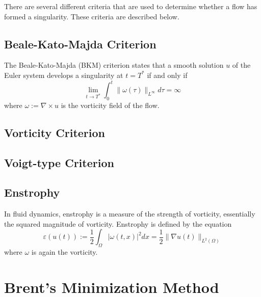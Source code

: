 \documentclass[12pt]{article}
\begin{document}
\begin{flushleft}
\qquad There are several different criteria that are used to determine whether a flow has formed a singularity. These criteria are described below.

\subsection{Beale-Kato-Majda Criterion}
The Beale-Kato-Majda (BKM) criterion states that a smooth solution $u$ of the Euler system develops a singularity at $t=T^*$ if and only if
$$\lim_{t\rightarrow T^*}\int_0^t \|\omega(\tau)\|_{L^\infty}d\tau = \infty$$
where $\omega:=\nabla\times u$ is the vorticity field of the flow. 

\subsection{Vorticity Criterion}
\subsection{Voigt-type Criterion}
\subsection{Enstrophy}
In fluid dynamics, enstrophy is a measure of the strength of vorticity, essentially the squared magnitude of vorticity. Enstrophy is defined by the equation
$$\varepsilon(u(t)):=\frac{1}{2}\int_{\Omega}|\omega(t,x)|^2dx = \frac{1}{2}\|\nabla u(t)\|_{L^2(\Omega)}$$
where $\omega$ is again the vorticity.

\section{Brent's Minimization Method}


\end{flushleft}
\end{document}
